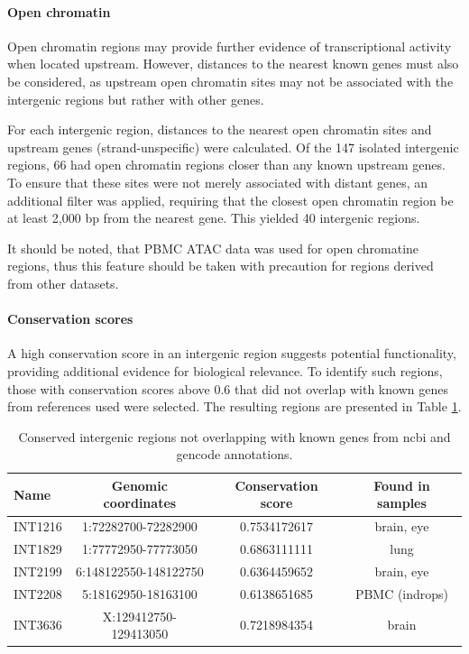 \paragraph{Open chromatin}

Open chromatin regions may provide further evidence of transcriptional activity when located upstream.
However, distances to the nearest known genes must also be considered,
as upstream open chromatin sites may not be associated with the intergenic regions but rather with other genes.

For each intergenic region, distances to the nearest open chromatin sites and upstream genes (strand-unspecific) were calculated.
Of the 147 isolated intergenic regions, 66 had open chromatin regions closer than any known upstream genes.
To ensure that these sites were not merely associated with distant genes, an additional filter was applied, 
requiring that the closest open chromatin region be at least 2,000 bp from the nearest gene.
This yielded 40 intergenic regions.

It should be noted, that PBMC ATAC data was used for open chromatine regions,
thus this feature should be taken with precaution for regions derived from other datasets.

\paragraph{Conservation scores}

A high conservation score in an intergenic region suggests potential functionality, providing additional evidence for biological relevance.
To identify such regions, those with conservation scores above 0.6 that did not overlap with known genes from references used were selected.
The resulting regions are presented in Table \ref{tab:conservedIntergenic}.

\begin{table}[h]
    \centering
    \begin{tabular}{lccc}
        \toprule
        Name & Genomic coordinates & Conservation score & Found in samples \\
        \midrule
        INT1216 & 1:72282700-72282900 & 0.7534172617 & brain, eye\\
	INT1829 & 1:77772950-77773050 & 0.6863111111 & lung \\
	INT2199 & 6:148122550-148122750 & 0.6364459652 & brain, eye \\
	INT2208 & 5:18162950-18163100 & 0.6138651685 & PBMC (indrops) \\
	INT3636 & X:129412750-129413050 & 0.7218984354 & brain \\
        \bottomrule
    \end{tabular}
    \caption{Conserved intergenic regions not overlapping with known genes from ncbi and gencode annotations.}
    \label{tab:conservedIntergenic}
\end{table}

